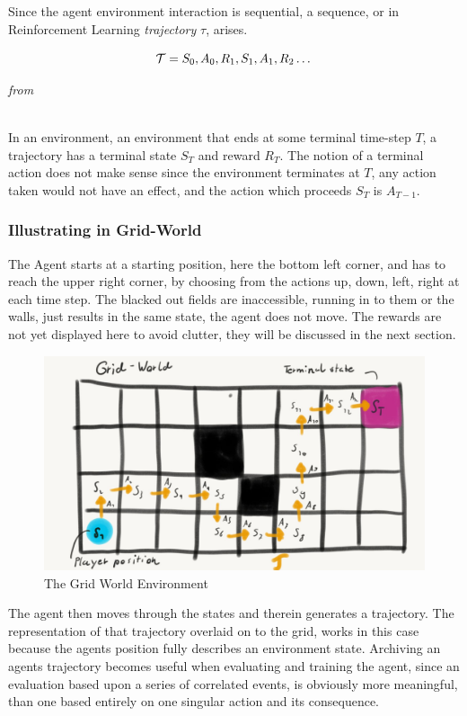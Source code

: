 \noindent
Since the agent environment interaction is sequential, a sequence, or in Reinforcement Learning \textit{trajectory} $\tau$, arises. 

\begin{equation}\label{MDP:trajectory}
    \mathcal{T} = S_0, A_0, R_1, S_1, A_1, R_2 \dots
\end{equation}
\centerline{\small\textit{from }}

\noindent
\\ In an  environment, an environment that ends at some terminal time-step $T$, a trajectory has a terminal state $S_T$ and reward $R_T$. The notion of a terminal action does not make sense since the environment terminates at $T$, any action taken would not have an effect, and the action which proceeds $S_T$ is $A_{T-1}$.

\subsubsection{Illustrating in Grid-World}\label{subsubsec:grid_world_trajectory}
The Agent starts at a starting position, here the bottom left corner, and has to reach the upper right corner, by choosing from the actions up, down, left, right at each time step. The blacked out fields are inaccessible, running in to them or the walls, just results in the same state, the agent does not move. The rewards are not yet displayed here to avoid clutter, they will be discussed in the next section.

\begin{figure}[h!]
    \centering
    \includegraphics[width=0.7\linewidth]{figures/Grid_world_trajectory.jpeg}
    \caption{The Grid World Environment}
    \label{fig:grid_world}
\end{figure}

\noindent
The agent then moves through the states and therein generates a trajectory. The representation of that trajectory overlaid on to the grid, works in this case because the agents position fully describes an environment state. Archiving an agents trajectory becomes useful when evaluating and training the agent, since an evaluation based upon a series of correlated events, is obviously more meaningful, than one based entirely on one singular action and its consequence.

